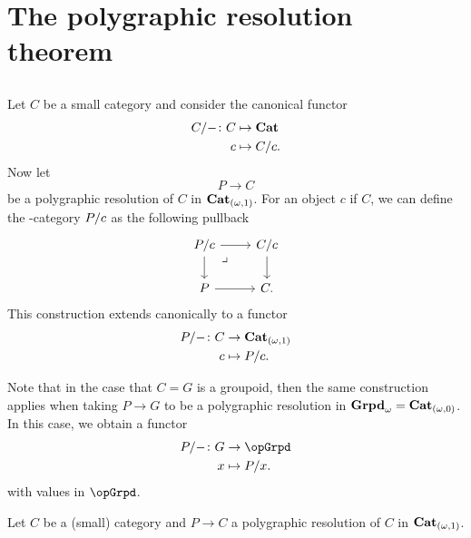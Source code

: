 \section{The polygraphic resolution theorem}

\subsection{}
\begin{paragr}
  Let $C$ be a small category and consider the canonical functor
  \[
    \begin{aligned}
      C/- \colon C &\mapsto \mathbf{Cat} \\
      c &\mapsto C/c.
    \end{aligned}
  \]
  Now let
  \[
    P \to C
  \]
  be a polygraphic resolution of $C$ in $\mathbf{Cat}_{(\omega,1)}$. For an object $c$
  if $C$, we can define the \nbd-category $P/c$
  as the following pullback
  \[
    \begin{tikzcd}
      \tr{P}{c} \ar[d] \ar[r] & \tr{C}{c} \ar[d] \\
      P \ar[r] & C.
      \ar[from=1-1,to=2-2,phantom,"\lrcorner",very near start]
    \end{tikzcd}
  \]
  This construction extends canonically to a functor
  \[
    \begin{aligned}
      P/- \colon C &\to \mathbf{Cat}_{(\omega,1)} \\
      c &\mapsto P/c.
    \end{aligned}
  \]

  Note that in the case that $C=G$ is a groupoid, then the same
  construction applies when taking $P \to G$ to be a polygraphic
  resolution in $\mathbf{Grpd}_{\omega}=\mathbf{Cat}_{(\omega,0)}$. In this case, we obtain a functor
  \[
       \begin{aligned}
      \tr{P}{-} \colon G &\to \opGrpd \\
      x &\mapsto \tr{P}{x}.
    \end{aligned} 
  \]
  with values in $\opGrpd$.
\end{paragr}
\begin{theorem}
  Let $C$ be a (small) category and $P \to C$ a polygraphic resolution
  of $C$ in $\mathbf{Cat}_{(\omega,1)}$. 
\end{theorem}